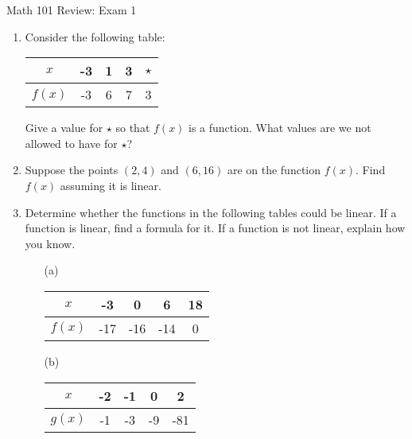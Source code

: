 \documentclass[12pt]{article}
\begin{document}
\begin{center}
Math 101 Review: Exam 1
\end{center}
\begin{enumerate}
    \item Consider the following table: 
\begin{center}
\begin{tabular}{c || c | c | c | c}
$x$ & -3 & 1 & 3 & $\star$ \\\hline
$f(x)$ & -3 & 6 & 7 & 3
\end{tabular}


\end{center}
Give a value for $\star$ so that $f(x)$ is a function. What values are we not allowed to have for $\star$?
\vspace{1in}

\item Suppose the points $(2,4)$ and $(6,16)$ are on the function $f(x)$. Find $f(x)$ assuming it is linear.

\vspace{1.in}

\item Determine whether the functions in the following tables could be linear.  If a function is linear, find a formula for it.  If a function is not linear, explain how you know. 

\begin{itemize}
\item[(a)] \hspace{1px} \vspace{-0.25in}

\begin{center}
\begin{tabular}{c || c | c | c | c}
$x$ & -3 & 0 & 6 & 18 \\\hline
$f(x)$ & -17 & -16 & -14 & 0
\end{tabular}
\end{center}
\vspace{2.5in}
\item[(b)] \hspace{1px}\vspace{-0.25in}

\begin{center}
\begin{tabular}{c || c | c | c | c}
$x$ & -2 & -1 & 0 & 2 \\\hline
$g(x)$ & -1 & -3 & -9 & -81
\end{tabular}
\end{center}


\end{itemize}
\end{enumerate}
\end{document}
